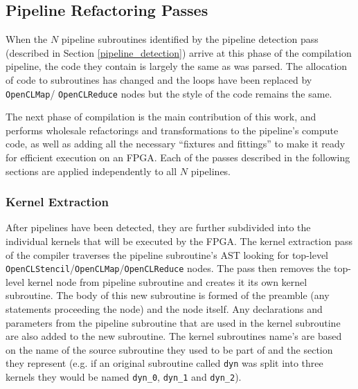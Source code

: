 \documentclass{mpaper}
\begin{document}
\subsection{Pipeline Refactoring Passes}
\label{pipeline_refactoring}

When the $N$ pipeline subroutines identified by the pipeline detection pass (described in Section \ref{pipeline_detection}) arrive at this phase of the compilation pipeline, the code they contain is largely the same as was parsed.
The allocation of code to subroutines has changed and the loops have been replaced by \texttt{OpenCLMap}/ \texttt{OpenCLReduce} nodes but the style of the code remains the same.

The next phase of compilation is the main contribution of this work, and performs wholesale refactorings and transformations to the pipeline's compute code, as well as adding all the necessary ``fixtures and fittings'' to make it ready for efficient execution on an FPGA.
Each of the passes described in the following sections are applied independently to all $N$ pipelines.

\subsubsection*{Kernel Extraction}

After pipelines have been detected, they are further subdivided into the individual kernels that will be executed by the FPGA.
The kernel extraction pass of the compiler traverses the pipeline subroutine's AST looking for top-level \texttt{OpenCLStencil}/\texttt{OpenCLMap}/\texttt{OpenCLReduce} nodes. 
The pass then removes the top-level kernel node from pipeline subroutine and creates it its own kernel subroutine.
The body of this new subroutine is formed of the preamble (any statements proceeding the node) and the node itself. 
Any declarations and parameters from the pipeline subroutine that are used in the kernel subroutine are also added to the new subroutine.
The kernel subroutines name's are based on the name of the source subroutine they used to be part of and the section they represent (e.g. if an original subroutine called \texttt{dyn} was split into three kernels they would be named \texttt{dyn\_0}, \texttt{dyn\_1} and \texttt{dyn\_2}).
\end{document}
